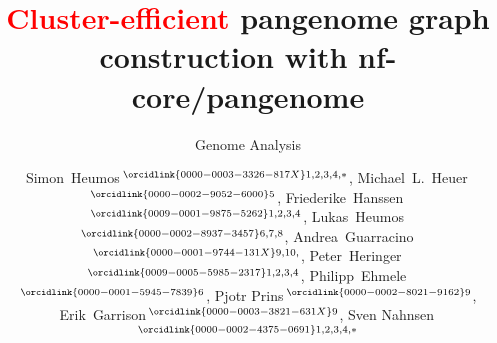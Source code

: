\documentclass{bioinfo}
\theoremstyle{definition}
\newcommand{\red}[1]{{\textcolor{Red}{#1}}}
\begin{document}

    \subtitle{Genome Analysis}

    \title[\red{Cluster-efficient} pangenome graph construction with nf-core/pangenome]{\red{Cluster-efficient} pangenome graph construction with nf-core/pangenome}
    
	\author[Heumos \textit{et~al}.]{
        Simon~Heumos\,$^{\orcidlink{0000-0003-3326-817X}1,2,3,4,*}$,
        Michael~L.~Heuer\,$^{\orcidlink{0000-0002-9052-6000}5}$,
        Friederike~Hanssen\,$^{\orcidlink{0009-0001-9875-5262}1,2,3,4}$,
        Lukas~Heumos\,$^{\orcidlink{0000-0002-8937-3457}6,7,8}$,
        Andrea~Guarracino\,$^{\orcidlink{0000-0001-9744-131X}9,10,}$,
        Peter~Heringer\,$^{\orcidlink{0009-0005-5985-2317}1,2,3,4}$,
        Philipp~Ehmele\,$^{\orcidlink{0000-0001-5945-7839}6}$,
        Pjotr Prins\,$^{\orcidlink{0000-0002-8021-9162}9}$,
        Erik~Garrison\,$^{\orcidlink{0000-0003-3821-631X}9}$,
        Sven Nahnsen\,$^{\orcidlink{0000-0002-4375-0691}1,2,3,4,*}$
    }

    \address{
	$^1$Quantitative Biology Center (QBiC) Tübingen, University of Tübingen, Tübingen, Germany \\ 
	$^2$Biomedical Data Science, Dept. of Computer Science, University of Tübingen, Tübingen, Germany \\ 
	$^3$M3 Research Center, University Hospital Tübingen, Tübingen, Germany \\ 
	$^4$Institute for Bioinformatics and Medical Informatics (IBMI), Eberhard-Karls University of Tübingen, Tübingen, Germany \\ 
	$^5$University of California, Berkeley, Berkeley, 94720, California, USA \\
	$^6$Institute of Computational Biology, Department of Computational Health, Helmholtz Munich, Germany \\ 
	$^7$Comprehensive Pneumology Center with the CPC-M bioArchive, Helmholtz Zentrum Munich, Member of the German Center for Lung Research (DZL), Munich, Germany \\ 
	$^8$TUM School of Life Sciences Weihenstephan, Technical University of Munich, Freising, Germany \\
	$^{9}$Department of Genetics, Genomics and Informatics, University of Tennessee Health Science Center, 71 S Manassas St, Memphis, 38163, Tennessee, USA \\ 
	$^{10}$Human Technopole, Viale Rita Levi-Montalcini 1, 20157, Milan, Italy \\
    }
\end{document}
